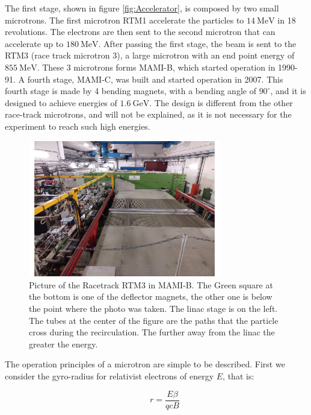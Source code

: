 The first stage, shown in figure \ref{fig:Accelerator}, is composed by two small microtrons. The first microtron RTM1 accelerate the particles to $\SI{14}{\mega \electronvolt}$ in 18 revolutions. The electrons are then sent to the second microtron that can accelerate up to $\SI{180}{\mega \electronvolt}$. After passing the first stage, the beam is sent to the RTM3 (race track microtron 3), a large microtron with an end point energy of $\SI{855}{\mega \electronvolt}$. These 3 microtrons forms MAMI-B, which started operation in 1990-91. A fourth stage, MAMI-C, was built and started operation in 2007. This fourth stage is made by 4 bending magnets, with a bending angle of $90^{\circ}$, and it is designed to achieve energies of $\SI{1.6}{\giga \electronvolt}$. The design is different from the other race-track microtrons, and will not be explained, as it is not necessary for the experiment to reach such high energies.

\begin{figure}[hbtp]
\centering
\includegraphics[width=0.75\textwidth]{ExperimentalSetup/Racetrack.pdf}
\caption{Picture of the Racetrack RTM3 in MAMI-B. The Green square at the bottom is one of the deflector magnets, the other one is below the point where the photo was taken. The linac stage is on the left. The tubes at the center of the figure are the paths that the particle cross during the recirculation. The further away from the linac the greater the energy.}
\end{figure}

The operation principles of a microtron are simple to be described. First we consider the gyro-radius for relativist electrons of energy $E$, that is:

\begin{equation}
\qquad r = \dfrac{E \beta}{qcB}
\end{equation}


